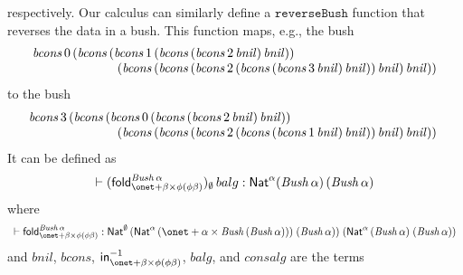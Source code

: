 \documentclass{lmcs}
\theoremstyle{plain}\newtheorem{satz}[thm]{Satz}
\newcommand{\fold}{\mathsf{fold}}
\begin{document}
respectively. Our calculus can similarly define a
$\mathtt{reverseBush}$ function that reverses the data in a bush. This
function maps, e.g., the bush
\[\begin{array}{l}
\mathit{bcons}\,0 \,(\mathit{bcons}\, (\mathit{bcons}\, 1\,
(\mathit{bcons}\, (\mathit{bcons}\, 2\,\mathit{bnil}) \,
\mathit{bnil}))\\ \hspace*{0.93in}(\mathit{bcons}\, (\mathit{bcons}\,
(\mathit{bcons}\, 2 \, (\mathit{bcons}\, (\mathit{bcons}\, 3\,
\mathit{bnil})\,  \mathit{bnil}))\, \mathit{bnil})\, \mathit{bnil}))
\end{array}\]
to the bush
\[\begin{array}{c}
\hspace*{-1.64in}\mathit{bcons}\,3\, (\mathit{bcons}\, (\mathit{bcons}\, 0
\,(\mathit{bcons}\, (\mathit{bcons}\, 2 \, \mathit{bnil}) \,
\mathit{bnil}))\\ 
\hspace*{0.93in}(\mathit{bcons}\, (\mathit{bcons}\, (\mathit{bcons}\, 2
\,(\mathit{bcons}\, (\mathit{bcons}\, 1 \, \mathit{bnil}) \,
\mathit{bnil})) \, \mathit{bnil})\, \mathit{bnil})) 
\end{array}\]
It can be defined as
\[\vdash (\fold^{\mathit{Bush}\,\alpha}_{\onet + \beta \times \phi (\phi \beta)})_\emptyset\, balg
: \Nat^\alpha (\mathit{Bush}\,\alpha)\,(\mathit{Bush}\,\alpha)\]
where
\[\begin{array}{lll}
\vdash \fold_{\onet + \beta \times \phi
  (\phi\beta)}^{\mathit{Bush}\,\alpha} : \Nat^{\emptyset}\, (\Nat^{\alpha}\, 
(\onet + \alpha \times \mathit{Bush}\, (\mathit{Bush}\, \alpha))) \;
(\mathit{Bush}\,\alpha))\; (\Nat^{\alpha} \,(\mathit{Bush}\,\alpha) \;
(\mathit{Bush}\,\alpha))\\
\end{array}\]
and $\mathit{bnil}$, $\mathit{bcons}$, $\tin^{-1}_{\onet + \beta
  \times \phi (\phi\beta)}$, $\mathit{balg}$, and $\mathit{consalg}$
are the terms
\end{document}
